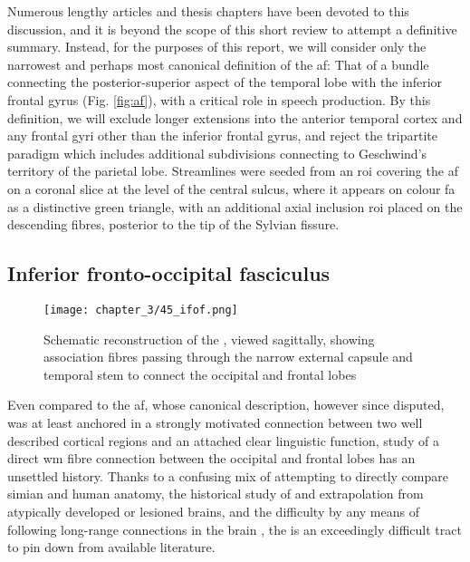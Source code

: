 \documentclass[12pt,phd,a4paper,twoside]{ucl_thesis}
\begin{document}
Numerous lengthy articles and thesis chapters have been devoted to this discussion, and it is beyond the scope of this short review to attempt a definitive summary.
Instead, for the purposes of this report, we will consider only the narrowest and perhaps most canonical definition of the \gls{af}:
That of a bundle connecting the posterior-superior aspect of the temporal lobe with the inferior frontal gyrus (Fig. \ref{fig:af}), with a critical role in speech production\autocite{Baldo2015}.
By this definition, we will exclude longer extensions into the anterior temporal cortex\autocite{Giampiccolo2022a} and any frontal gyri other than the inferior frontal gyrus, and reject the tripartite paradigm which includes additional subdivisions connecting to Geschwind's territory of the parietal lobe\autocite{Catani2005,Martino2013a}.
Streamlines were seeded from an \gls{roi} covering the \gls{af} on a coronal slice at the level of the central sulcus, where it appears on colour \gls{fa} as a distinctive green triangle, with an additional axial inclusion \gls{roi} placed on the descending fibres, posterior to the tip of the Sylvian fissure.


\subsection{Inferior fronto-occipital fasciculus}



\begin{SCfigure}[][hbt!]
  \texttt{[image: chapter\_3/45\_ifof.png]}
  \caption[Inferior fronto-occipital fasciculus]{Schematic reconstruction of the , viewed sagittally, showing association fibres passing through the narrow external capsule and temporal stem to connect the occipital and frontal lobes}
  \label{fig:ifof}
\end{SCfigure}

Even compared to the \gls{af}, whose canonical description, however since disputed, was at least anchored in a strongly motivated connection between two well described cortical regions and an attached clear linguistic function, study of a direct \gls{wm} fibre connection between the occipital and frontal lobes has an unsettled history\autocite{Forkel2014a}.
Thanks to a confusing mix of attempting to directly compare simian and human anatomy\autocite{Schmahmann2007,ThiebautdeSchotten2012,Mandonnet2018,Sarubbo2019}, the historical study of and extrapolation from atypically developed or lesioned brains\autocite{Schmahmann2007,Forkel2014a}, and the difficulty by any means of following long-range connections in the brain
\autocite{Martino2010}, the  is an exceedingly difficult tract to pin down from available literature\autocite{Sarubbo2019,Weiller2021}.
\end{document}
